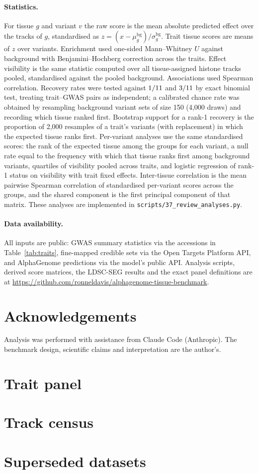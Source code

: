 \documentclass[11pt]{article}
\begin{document}
\paragraph{Statistics.} For tissue $g$ and variant $v$ the raw score is the mean absolute
predicted effect over the tracks of $g$, standardised as
$z = (x - \mu_g^{\mathrm{bg}})/\sigma_g^{\mathrm{bg}}$. Trait tissue scores are means of
$z$ over variants. Enrichment used one-sided Mann--Whitney $U$ against background with
Benjamini--Hochberg correction across the \NTRAITS{} traits. Effect visibility is the
same statistic computed over all tissue-assigned histone tracks pooled, standardised
against the pooled background. Associations used Spearman correlation. Recovery rates
were tested against $1/11$ and $3/11$ by exact binomial test, treating
trait--GWAS pairs as independent; a calibrated chance rate was obtained by resampling
background variant sets of size 150 (4{,}000 draws) and recording which tissue ranked
first. Bootstrap support for a rank-1 recovery is the proportion of 2{,}000 resamples of a
trait's variants (with replacement) in which the expected tissue ranks first. Per-variant
analyses use the same standardised scores: the rank of the expected tissue among the
\NTISSUE{} groups for each variant, a null rate equal to the frequency with which that
tissue ranks first among background variants, quartiles of visibility pooled across
traits, and logistic regression of rank-1 status on visibility with trait fixed effects.
Inter-tissue correlation is the mean pairwise Spearman correlation of standardised
per-variant scores across the \NTISSUE{} groups, and the shared component is the first
principal component of that matrix. These analyses are implemented in
\texttt{scripts/37\_review\_analyses.py}.

\paragraph{Data availability.} All inputs are public: GWAS summary statistics via the
accessions in Table~\ref{tab:traits}, fine-mapped credible sets via the Open Targets
Platform API, and AlphaGenome predictions via the model's public API. Analysis scripts,
derived score matrices, the LDSC-SEG results and the exact panel definitions are at
\url{https://github.com/ronneldavis/alphagenome-tissue-benchmark}.

\section*{Acknowledgements}
Analysis was performed with assistance from Claude Code (Anthropic). The benchmark
design, scientific claims and interpretation are the author's.




\appendix
\section{Trait panel}

\section{Track census}

\clearpage
\section{Superseded datasets}\label{app:superseded}

\end{document}
